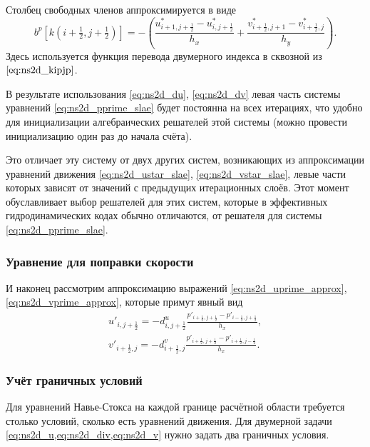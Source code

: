 Столбец свободных членов аппроксимируется в виде
\begin{equation}
    \label{eq:ns2d_bp}
    b^p[k(i+\tfrac12,j+\tfrac12)] = 
        -\left(
              \frac{u^*_{i+1,j+\tfrac12} - u^*_{i,j+\tfrac12}}{h_x}
            + \frac{v^*_{i+\tfrac12,j+1} - v^*_{i+\tfrac12,j}}{h_y}
        \right).
\end{equation}
Здесь используется функция перевода двумерного индекса в сквозной из $\eqref{eq:ns2d_kipjp}$.

В результате использования \eqref{eq:ns2d_du}, \eqref{eq:ns2d_dv} левая часть системы уравнений \eqref{eq:ns2d_pprime_slae}
будет постоянна на всех итерациях, что удобно для инициализации алгебраических решателей этой системы
(можно провести инициализацию один раз до начала счёта).

Это отличает эту систему от двух других систем, возникающих
из аппроксимации уравнений движения \eqref{eq:ns2d_ustar_slae}, \eqref{eq:ns2d_vstar_slae},
левые части которых зависят от значений с предыдущих
итерационных слоёв. Этот момент обуславливает выбор
решателей для этих систем, которые в эффективных гидродинамических кодах обычно
отличаются, от решателя для системы \eqref{eq:ns2d_pprime_slae}.


\subsubsection{Уравнение для поправки скорости}
И наконец рассмотрим аппроксимацию выражений \eqref{eq:ns2d_uprime_approx},
\eqref{eq:ns2d_vprime_approx}, которые примут явный вид
\begin{align}
    \label{eq:ns2d_uprime_discr}
    u'_{i,j+\tfrac12} = -d^u_{i,j+\tfrac12} \frac{p'_{i+\tfrac12,j+\tfrac12} - p'_{i-\tfrac12, j+\tfrac12}}{h_x}, \\[10pt]
    \label{eq:ns2d_vprime_discr}
    v'_{i+\tfrac12,j} = -d^v_{i+\tfrac12,j} \frac{p'_{i+\tfrac12,j+\tfrac12} - p'_{i+\tfrac12, j-\tfrac12}}{h_x}.
\end{align}

\subsubsection{Учёт граничных условий}
\label{sec:simple-bc}

Для уравнений Навье-Стокса на каждой границе расчётной области
требуется столько условий, сколько есть уравнений движения.
Для двумерной задачи \cref{eq:ns2d_u,eq:ns2d_div,eq:ns2d_v}
нужно задать два граничных условия.

